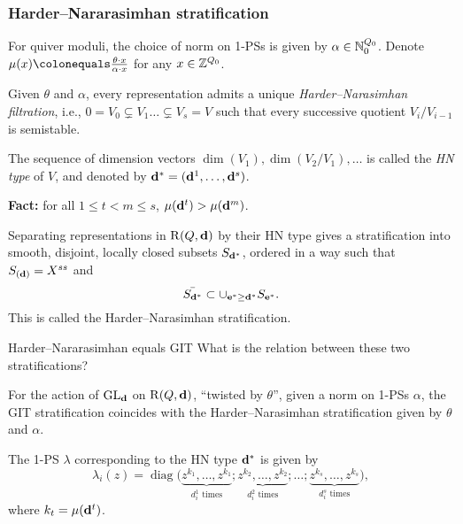\documentclass{beamer}
\begin{document}
\begin{frame}
    \frametitle{Harder--Nararasimhan stratification}
    For quiver moduli, the choice of norm on 1-PSs is given by $\alpha \in \mathbb{N}^{Q_0}_0$.
    Denote $\mu(x) \colonequals \frac{\theta \cdot x}{\alpha \cdot x}$ for any $x \in \mathbb{Z}^{Q_0}$. \pause

\begin{definition}
    Given $\theta$ and $\alpha$, every representation admits a unique \emph{Harder--Narasimhan filtration},
    i.e., $ 0 = V_0 \subsetneq V_1 \dots \subsetneq V_s = V$ such that every successive quotient
    $V_i/V_{i-1}$ is semistable.
\end{definition} \pause
The sequence of dimension vectors $\dim(V_1), \dim(V_2/V_1), \dots$ is
called the \emph{HN type} of $V$, and denoted by $\mathbf{d}^* = (\mathbf{d}^1,\dots,\mathbf{d}^s)$. \pause

{\bf Fact: } for all $1 \leq t < m \leq s$, $\mu(\mathbf{d}^{t}) > \mu(\mathbf{d}^m)$.\pause
\begin{theorem}
Separating representations in $\operatorname{R}(Q, \mathbf{d})$ by their HN type gives
a stratification into smooth, disjoint, locally closed subsets $S_{\mathbf{d}^*}$,
ordered in a way such that $S_{(\mathbf{d})} = X^{ss}$ and
\[\bar{S_{\mathbf{d}^*}} \subset \cup_{\mathbf{e}^* \geq \mathbf{d}^*} S_{\mathbf{e}^*}.\] \pause
This is called the Harder--Narasimhan stratification.
\end{theorem}
\end{frame}
\begin{frame}{Harder--Nararasimhan equals GIT}
What is the relation between these two stratifications? \pause
    \begin{theorem}
        For the action of $\operatorname{\operatorname{GL}_{\mathbf{d}}}$ on $\operatorname{R}(Q, \mathbf{d})$,
        ``twisted by $\theta$'', given a norm on 1-PSs $\alpha$,
        the GIT stratification coincides with the Harder--Narasimhan
        stratification given by $\theta$ and $\alpha$.
    \end{theorem}\pause
    
    \begin{corollary}
        The 1-PS $\lambda$ corresponding to the HN type $\mathbf{d}^*$ is given by
        \[ \lambda_i(z) = \operatorname{diag}\big( \underbrace{z^{k_1},\ldots,z^{k_1}}_{d_i^1 \text{ times}}; \underbrace{z^{k_2},\ldots,z^{k_2}}_{d_i^2 \text{ times}};\ldots; \underbrace{z^{k_s},\ldots,z^{k_s}}_{d_i^s \text{ times}} \big),\]
        where $k_t = \mu(\mathbf{d}^t)$.
    \end{corollary}
    
\end{frame}
\end{document}

